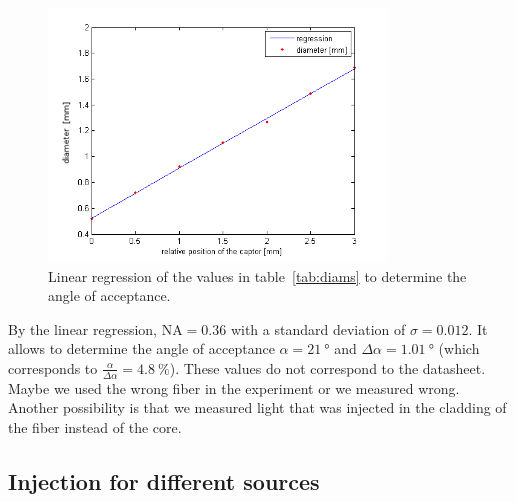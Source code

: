 \documentclass[a4paper, 12pt]{paper}
\begin{document}
\begin{figure}[H]
    \centering
    \includegraphics[width=0.8\textwidth]{img/NA_graph}
    \caption{Linear regression of the values in table~\ref{tab:diams} to determine the angle of acceptance.}
    \label{fig:angle_of_a_regression}
\end{figure}

By the linear regression, $\mbox{NA} = 0.36$ with a standard deviation of $\sigma = 0.012$.
It allows to determine the angle of acceptance $\alpha = \SI{21}{\degree}$ and $\Delta \alpha = \SI{1.01}{\degree}$ (which corresponds to $\frac{\alpha}{\Delta \alpha} = \SI{4.8}{\percent}$). 
These values do not correspond to the datasheet.
Maybe we used the wrong fiber in the experiment or we measured wrong.
Another possibility is that we measured light that was injected in the cladding of the fiber instead of the core.

\subsection{Injection for different sources}
\end{document}
